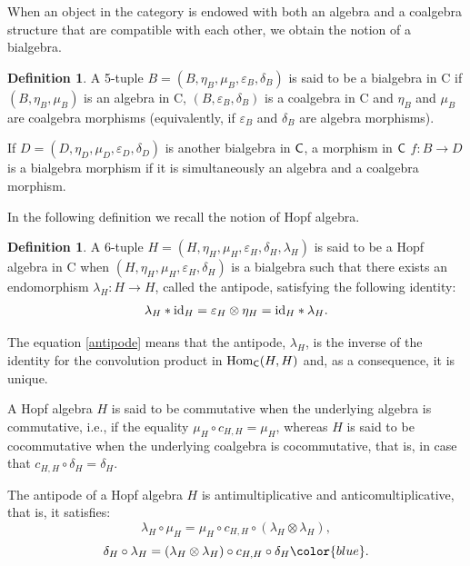\documentclass[11pt,reqno]{amsart}
\theoremstyle{plain}%
\theoremstyle{definition}
\newtheorem{definition}[theorem]{Definition}%
\theoremstyle{remark}
\begin{document}
When an object in the category is endowed with both an algebra and a coalgebra structure that are compatible with each other, we obtain the notion of a bialgebra.
\begin{definition}
	A 5-tuple $B=(B,\eta_{B},\mu_{B},\varepsilon_{B},\delta_{B})$ is said to be a bialgebra in {\sf C} if $(B,\eta_{B},\mu_{B})$ is an algebra in {\sf C}, $(B,\varepsilon_{B},\delta_{B})$ is a coalgebra in {\sf C} and $\eta_{B}$ and $\mu_{B}$ are coalgebra morphisms (equivalently, if $\varepsilon_{B}$ and $\delta_{B}$ are algebra morphisms).
	
	If $D=(D,\eta_{D},\mu_{D},\varepsilon_{D},\delta_{D})$ is another bialgebra in ${\sf C}$, a morphism in ${\sf C}$ $f\colon B\rightarrow D$ is a bialgebra morphism if it is simultaneously an algebra and a coalgebra morphism.
\end{definition}

In the following definition we recall the notion of Hopf algebra.
\begin{definition}
	A 6-tuple $H=(H,\eta_{H},\mu_{H},\varepsilon_{H},\delta_{H},\lambda_{H})$ is said to be a Hopf algebra in {\sf C} when $(H,\eta_{H},\mu_{H},\varepsilon_{H},\delta_{H})$ is a bialgebra such that there exists an endomorphism $\lambda_{H}\colon H\rightarrow H$, called the antipode, satisfying the following identity:
	\begin{gather}\label{antipode}
		\lambda_{H}\ast {\rm id}_{H}=\varepsilon_{H}\otimes\eta_{H}={\rm id}_{H}\ast \lambda_{H}.
\end{gather}
\end{definition}

The equation \eqref{antipode} means that the antipode, $\lambda_{H}$, is the inverse of the identity for the convolution product in $\operatorname{Hom}_{{\sf C}}(H,H)$ and, as a consequence, it is unique.

A Hopf algebra $H$ is said to be commutative when the underlying algebra is commutative, i.e., if the equality $\mu_{H}\circ c_{H,H}=\mu_{H}$, whereas $H$ is said to be cocommutative when the underlying coalgebra is cocommutative, that is, in case that $c_{H,H}\circ\delta_{H}=\delta_{H}$.

The antipode of a Hopf algebra $H$ is antimultiplicative and anticomultiplicative, that is, it satisfies:
\begin{equation*}\label{a-antip1}
	\lambda_{H}\circ\mu_{H}=\mu_{H}\circ c_{H,H}\circ(\lambda_{H}\otimes\lambda_{H}),
\end{equation*}
\begin{equation}
\label{a-antip2}
	\delta_{H}\circ\lambda_{H}=(\lambda_{H}\otimes\lambda_{H})\circ c_{H,H}\circ \delta_{H}{\color{blue} .}
\end{equation}
\end{document}
